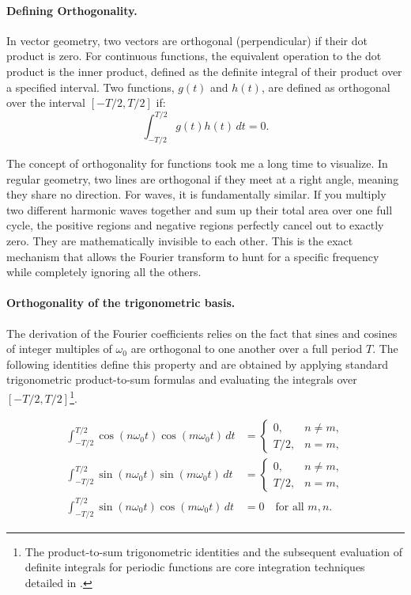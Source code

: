 \documentclass{article}
\begin{document}
\paragraph{Defining Orthogonality.}
In vector geometry, two vectors are orthogonal (perpendicular) if their dot product is zero. For continuous functions, the equivalent operation to the dot product is the inner product, defined as the definite integral of their product over a specified interval. Two functions, $g(t)$ and $h(t)$, are defined as orthogonal over the interval $[-T/2, T/2]$ if:
\begin{equation}
    \int_{-T/2}^{T/2} g(t)h(t)\,dt = 0.
\end{equation}

The concept of orthogonality for functions took me a long time to visualize. In regular geometry, two lines are orthogonal if they meet at a right angle, meaning they share no direction. For waves, it is fundamentally similar. If you multiply two different harmonic waves together and sum up their total area over one full cycle, the positive regions and negative regions perfectly cancel out to exactly zero. They are mathematically invisible to each other. This is the exact mechanism that allows the Fourier transform to hunt for a specific frequency while completely ignoring all the others.

\paragraph{Orthogonality of the trigonometric basis.}
The derivation of the Fourier coefficients relies on the fact that sines and cosines of integer multiples of $\omega_0$ are orthogonal to one another over a full period $T$.  The following identities define this property and are obtained by applying standard trigonometric product-to-sum formulas and evaluating the integrals over $[-T/2,T/2]$\footnote{The product-to-sum trigonometric identities and the subsequent evaluation of definite integrals for periodic functions are core integration techniques detailed in \cite{haese_aa_hl}.}.

\begin{align}
    \int_{-T/2}^{T/2} \cos(n\omega_0 t)\cos(m\omega_0 t)\,dt &= 
        \begin{cases}
            0, & n\neq m, \\
            T/2, & n=m,
        \end{cases} \label{eq:ortho_cc}\\[1em]
    \int_{-T/2}^{T/2} \sin(n\omega_0 t)\sin(m\omega_0 t)\,dt &= 
        \begin{cases}
            0, & n\neq m, \\
            T/2, & n=m,
        \end{cases} \label{eq:ortho_ss}\\[1em]
    \int_{-T/2}^{T/2} \sin(n\omega_0 t)\cos(m\omega_0 t)\,dt &= 0 \quad \text{for all } m,n.
    \label{eq:ortho_sc}
\end{align}
\end{document}
